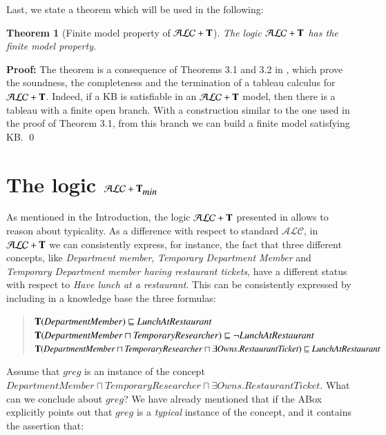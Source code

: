 \documentclass[a4paper, 11pt, oneside]{elsarticle}
\newcommand{\tip}{{\bf T}}
\newcommand{\alc}{\mathcal{ALC}}
\newcommand{\alct}{\mathcal{ALC}+\tip}
\newcommand{\alctmin}{\mathcal{ALC}+\tip_{\mbox{\em min}}}
\newcommand {\nott} {\lnot}
\newcommand{\sqset}{\sqsubseteq}
\newcommand{\mint}{\sqcap}
\newenvironment{proof}
{\begin{trivlist} \item[] {\bf Proof:}}%
{\qed \end{trivlist}}
\newtheorem{theorem}{Theorem}
\newcounter{posu}
\newtheorem{theorem}[posu]{Theorem}
\newtheorem{proof}[posu]{Proof}
\begin{document}
Last, we state a theorem which will be used in the following:

\begin{theorem}[Finite model property of $\alct$]\label{fmpALCT}
The logic $\alct$ has the finite model property.
\end{theorem}

\begin{proof}
The theorem is a consequence of Theorems 3.1 and 3.2 in \cite{FI09},
which prove the soundness, the completeness and the termination of a tableau calculus for $\alct$. Indeed, if
a KB is satisfiable in an $\alct$ model, then there is a tableau with a finite open branch. With a construction similar to the one
used in the proof of Theorem 3.1, from this branch we can build a finite model satisfying KB.
\end{proof}



\section{The logic $\alctmin$}\label{alctmin}

As mentioned in the Introduction, the logic $\alct$ presented in
\cite{FI09} allows  to reason about typicality. As a difference
with respect to standard $\alc$, in $\alct$ we can consistently
express, for instance, the fact that three different concepts,
like {\em Department member}, {\em Temporary Department Member}
and {\em Temporary Department member having restaurant tickets},
have a different status with respect to {\em Have lunch at a
restaurant}. This can be consistently expressed by including in a
knowledge base the three formulas:

\begin{quote}
$\tip (\mathit{DepartmentMember}) \sqset \mathit{LunchAtRestaurant}$\\
$\tip (\mathit{DepartmentMember} \mint \mathit{TemporaryResearcher})  \sqset \nott \mathit{LunchAtRestaurant}$\\
$\tip (\mathit{DepartmentMember} \mint \mathit{TemporaryResearcher} \mint \exists \mathit{Owns}.\mathit{RestaurantTicket})  \sqset \mathit{LunchAtRestaurant}$
\end{quote}

\noindent Assume that $\mathit{greg}$ is an instance of the concept
$\mathit{DepartmentMember} \sqcap \mathit{TemporaryResearcher} \sqcap \exists \mathit{Owns}.\mathit{RestaurantTicket}$. What can we conclude about
$\mathit{\mathit{greg}}$? We have already mentioned that if the ABox explicitly points out that $\mathit{greg}$ is a {\em typical} instance of the  concept, and it contains the assertion that:
\end{document}
